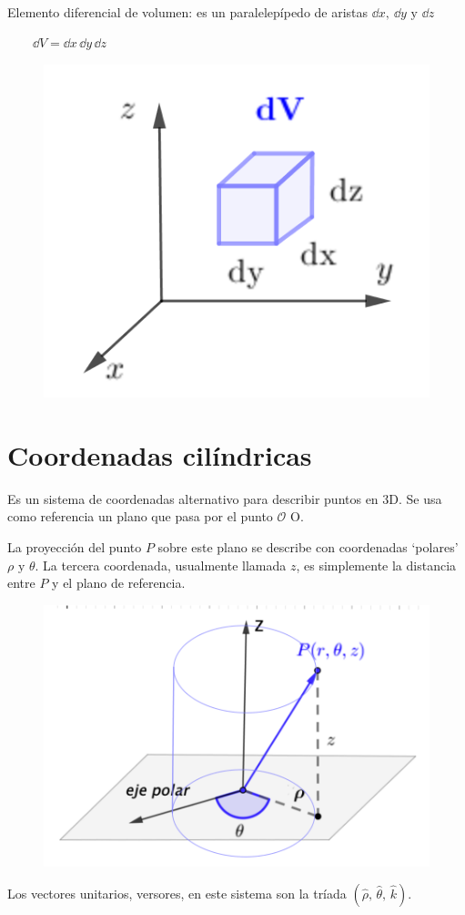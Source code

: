 \vspace{0.5cm}
\begin{multicols}{2}
$\quad$

\normalsize{E}lemento diferencial de volumen: es un paralelepípedo de aristas $\dd x,\ \dd y \text{ y } \dd z$

$\qquad \dd V=\dd x \, \dd y\, \dd z$
	\begin{figure}[H]
	\centering
	\includegraphics[width=.3\textwidth]{img-coordenadas/coordenadas-07.png}
	\end{figure}
\end{multicols}


\vspace{1cm}
\section{Coordenadas cilíndricas}

\vspace{0.5cm}

\begin{multicols}{2}
\normalsize{Es} un sistema de coordenadas alternativo para describir puntos en 3D. Se usa como referencia un plano que pasa por el punto $\mathcal O$ O. 

La proyección del punto $P$ sobre este plano se describe con coordenadas `polares' $\rho \text{ y } \theta$. La tercera coordenada, usualmente llamada $z$, es simplemente la distancia entre $P$ y el plano de referencia. 

	\begin{figure}[H]
	\centering
	\includegraphics[width=.4\textwidth]{img-coordenadas/coordenadas-08.png}
	\end{figure}
\end{multicols}
Los vectores unitarios, versores, en este sistema son la tríada $(\widehat \rho,\, \widehat \theta,\, \widehat k)$.

